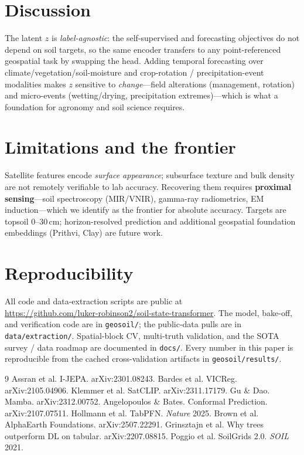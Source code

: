 \documentclass[11pt]{article}
\begin{document}
\section{Discussion}
The latent $z$ is \emph{label-agnostic}: the self-supervised and forecasting
objectives do not depend on soil targets, so the same encoder transfers to any
point-referenced geospatial task by swapping the head. Adding temporal forecasting
over climate/vegetation/soil-moisture and crop-rotation / precipitation-event
modalities makes $z$ sensitive to \emph{change}---field alterations (management,
rotation) and micro-events (wetting/drying, precipitation extremes)---which is what a
foundation for agronomy and soil science requires.

\section{Limitations and the frontier}
Satellite features encode \emph{surface appearance}; subsurface texture and bulk
density are not remotely verifiable to lab accuracy. Recovering them requires
\textbf{proximal sensing}---soil spectroscopy (MIR/VNIR), gamma-ray radiometrics,
EM induction---which we identify as the frontier for absolute accuracy. Targets are
topsoil 0--30\,cm; horizon-resolved prediction and additional geospatial foundation
embeddings (Prithvi, Clay) are future work.

\section{Reproducibility}
All code and data-extraction scripts are public at\\
\url{https://github.com/luker-robinson2/soil-state-transformer}.
The model, bake-off, and verification code are in \texttt{geosoil/}; the public-data
pulls are in \texttt{data/extraction/}. Spatial-block CV, multi-truth validation, and
the SOTA survey / data roadmap are documented in \texttt{docs/}. Every number in this
paper is reproducible from the cached cross-validation artifacts in
\texttt{geosoil/results/}.

\begin{thebibliography}{9}\small
{} Assran et al. I-JEPA. arXiv:2301.08243.
 Bardes et al. VICReg. arXiv:2105.04906.
 Klemmer et al. SatCLIP. arXiv:2311.17179.
 Gu \& Dao. Mamba. arXiv:2312.00752.
 Angelopoulos \& Bates. Conformal Prediction. arXiv:2107.07511.
 Hollmann et al. TabPFN. \emph{Nature} 2025.
 Brown et al. AlphaEarth Foundations. arXiv:2507.22291.
 Grinsztajn et al. Why trees outperform DL on tabular. arXiv:2207.08815.
 Poggio et al. SoilGrids 2.0. \emph{SOIL} 2021.
\end{thebibliography}
\end{document}
